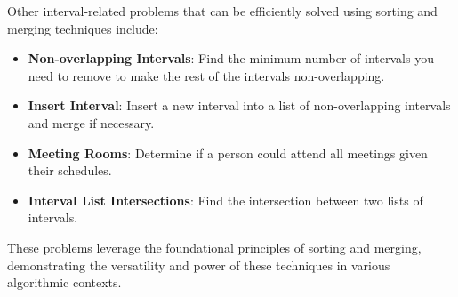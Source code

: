 Other interval-related problems that can be efficiently solved using sorting and merging techniques include:
\begin{itemize}
    \item \textbf{Non-overlapping Intervals}: Find the minimum number of intervals you need to remove to make the rest of the intervals non-overlapping.
    
    \item \textbf{Insert Interval}: Insert a new interval into a list of non-overlapping intervals and merge if necessary.
    
    \item \textbf{Meeting Rooms}: Determine if a person could attend all meetings given their schedules.
    
    \item \textbf{Interval List Intersections}: Find the intersection between two lists of intervals.
\end{itemize}
These problems leverage the foundational principles of sorting and merging, demonstrating the versatility and power of these techniques in various algorithmic contexts.

